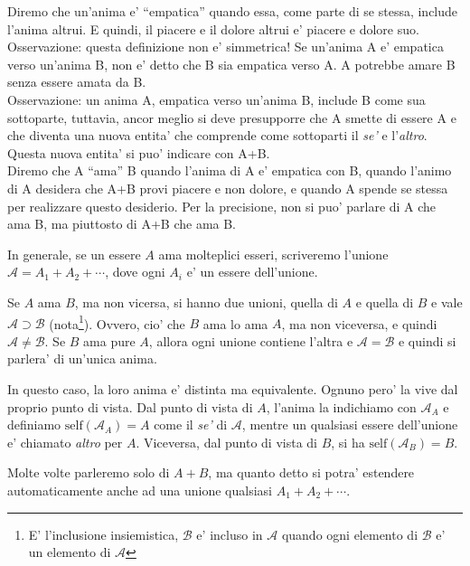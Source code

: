 Diremo che un'anima e' ``empatica'' quando essa, come parte di se stessa, include l'anima altrui. E quindi, il piacere e il dolore altrui e' piacere e dolore suo. \\
Osservazione: questa definizione non e' simmetrica! Se un'anima A e' empatica verso un'anima B, non e' detto che B sia empatica verso A. A potrebbe amare B senza essere amata da B. \\
Osservazione: un anima A, empatica verso un'anima B, include B come sua sottoparte, tuttavia, ancor meglio si deve presupporre che A smette di essere A e che diventa una nuova entita' che comprende come sottoparti il \emph{se'} e l'\emph{altro}. Questa nuova entita' si puo' indicare con A+B. \\

Diremo che A ``ama'' B quando l'anima di A e' empatica con B, quando l'animo di A desidera che A+B provi piacere e non dolore, e quando A spende se stessa per realizzare questo desiderio. Per la precisione, non si puo' parlare di A che ama B, ma piuttosto di A+B che ama B. 

In generale, se un essere $A$ ama molteplici esseri, scriveremo l'unione $\mathcal{A}=A_1+A_2+\cdots$, dove ogni $A_i$ e' un essere dell'unione.

\def\self{\textrm{self}}
\def\other{\textrm{other}}

Se $A$ ama $B$, ma non vicersa, si hanno due unioni, quella di $A$ e quella di $B$ e vale $\mathcal{A} \supset \mathcal{B}$ (nota\footnote{E' l'inclusione insiemistica, $\mathcal{B}$ e' incluso in $\mathcal{A}$ quando ogni elemento di $\mathcal{B}$ e' un elemento di $\mathcal{A}$}).  Ovvero, cio' che $B$ ama lo ama $A$, ma non viceversa, e quindi $\mathcal{A} \neq \mathcal{B}$. Se $B$ ama pure $A$, allora ogni unione contiene l'altra e $\mathcal{A} = \mathcal{B}$ e quindi si parlera' di un'unica anima. 

In questo caso, la loro anima e' distinta ma equivalente.  Ognuno pero' la vive dal proprio punto di vista. Dal punto di vista di $A$, l'anima la indichiamo con $\mathcal{A}_A$ e definiamo $\textrm{self}(\mathcal{A}_A)=A$ come il \emph{se'} di $\mathcal{A}$, mentre un qualsiasi essere dell'unione e' chiamato \emph{altro} per $A$. Viceversa, dal punto di vista di $B$, si ha $\textrm{self}(\mathcal{A}_B)=B$.

Molte volte parleremo solo di $A+B$, ma quanto detto si potra' estendere automaticamente anche ad una unione qualsiasi $A_1+A_2+\cdots$. \\

